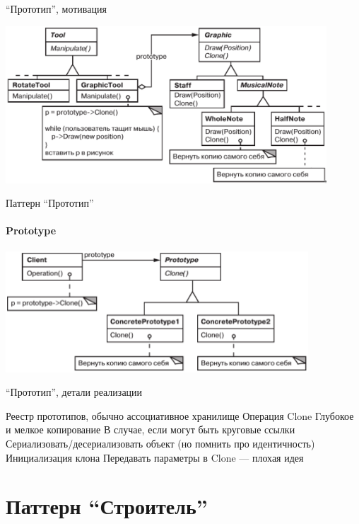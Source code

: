 \documentclass{../../slides-style}
\begin{document}
    \begin{frame}{\enquote{Прототип}, мотивация}
        \begin{center}
            \includegraphics[width=0.9\textwidth]{musicalEditor.png}
        \end{center}
    \end{frame}

    \begin{frame}{Паттерн \enquote{Прототип}}
        \framesubtitle{Prototype}
        \begin{center}
            \includegraphics[width=0.85\textwidth]{prototype.png}
        \end{center}
    \end{frame}
    
    \begin{frame}{\enquote{Прототип}, детали реализации}
        \begin{outline}
            \1 Реестр прототипов, обычно ассоциативное хранилище
            \1 Операция Clone
                \2 Глубокое и мелкое копирование
                \2 В случае, если могут быть круговые ссылки
                \2 Сериализовать/десериализовать объект (но помнить про идентичность)
            \1 Инициализация клона
                \2 Передавать параметры в Clone --- плохая идея
        \end{outline}
    \end{frame}

    \section{Паттерн \enquote{Строитель}}
\end{document}
